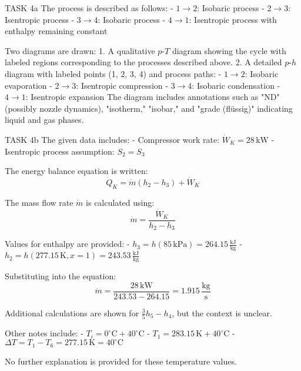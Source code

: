 TASK 4a  
The process is described as follows:  
- \( 1 \to 2 \): Isobaric process  
- \( 2 \to 3 \): Isentropic process  
- \( 3 \to 4 \): Isobaric process  
- \( 4 \to 1 \): Isentropic process with enthalpy remaining constant  

Two diagrams are drawn:  
1. A qualitative \( p \)-\( T \) diagram showing the cycle with labeled regions corresponding to the processes described above.  
2. A detailed \( p \)-\( h \) diagram with labeled points (1, 2, 3, 4) and process paths:  
   - \( 1 \to 2 \): Isobaric evaporation  
   - \( 2 \to 3 \): Isentropic compression  
   - \( 3 \to 4 \): Isobaric condensation  
   - \( 4 \to 1 \): Isentropic expansion  
   The diagram includes annotations such as "ND" (possibly nozzle dynamics), "isotherm," "isobar," and "grade (flüssig)" indicating liquid and gas phases.  

TASK 4b  
The given data includes:  
- Compressor work rate: \( \dot{W}_K = 28 \, \text{kW} \)  
- Isentropic process assumption: \( S_2 = S_3 \)  

The energy balance equation is written:  
\[
\dot{Q}_K = \dot{m} (h_2 - h_3) + \dot{W}_K
\]  

The mass flow rate \( \dot{m} \) is calculated using:  
\[
\dot{m} = \frac{\dot{W}_K}{h_2 - h_3}
\]  

Values for enthalpy are provided:  
- \( h_3 = h(85 \, \text{kPa}) = 264.15 \, \frac{\text{kJ}}{\text{kg}} \)  
- \( h_2 = h(277.15 \, \text{K}, x=1) = 243.53 \, \frac{\text{kJ}}{\text{kg}} \)  

Substituting into the equation:  
\[
\dot{m} = \frac{28 \, \text{kW}}{243.53 - 264.15} = 1.915 \, \frac{\text{kg}}{\text{s}}
\]  

Additional calculations are shown for \( \frac{3}{5} h_5 - h_4 \), but the context is unclear.  

Other notes include:  
- \( T_i = 0^\circ \text{C} + 40^\circ \text{C} \)  
- \( T_1 = 283.15 \, \text{K} + 40^\circ \text{C} \)  
- \( \Delta T = T_1 - T_6 = 277.15 \, \text{K} = 40^\circ \text{C} \)  

No further explanation is provided for these temperature values.